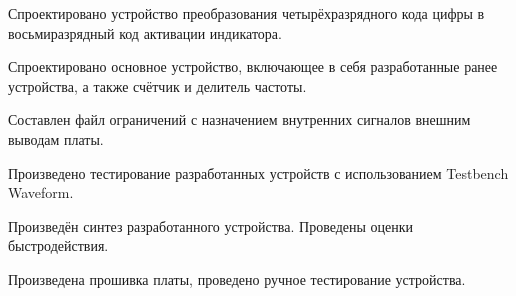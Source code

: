 \documentclass[a4paper, 14pt]{extarticle}
\begin{document}
    Спроектировано устройство преобразования четырёхразрядного кода цифры в восьмиразрядный код активации индикатора.

    Спроектировано основное устройство, включающее в себя разработанные ранее устройства, а также счётчик и делитель частоты.

    Составлен файл ограничений с назначением внутренних сигналов внешним выводам платы.

    Произведено тестирование разработанных устройств с использованием Testbench Waveform.
    
    Произведён синтез разработанного устройства. Проведены оценки быстродействия.

    Произведена прошивка платы, проведено ручное тестирование устройства.
\end{document}
